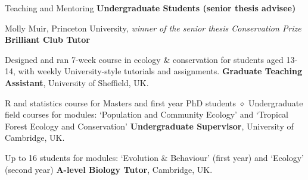 \begin{rubric}{Teaching and Mentoring}
\entry*[2019 -- 2020] \textbf{Undergraduate Students (senior thesis advisee)}
\par Molly Muir, Princeton University, \emph{winner of the senior thesis Conservation Prize}
\entry*[2017 -- 2018] \textbf{Brilliant Club Tutor}
\par Designed and ran 7-week course in ecology \& conservation for students aged 13-14, with weekly University-style tutorials and assignments.
\entry*[2014 -- 2018] \textbf{Graduate Teaching Assistant}, University of Sheffield, UK.
\par R and statistics course for Masters and first year PhD students $\diamond$ Undergraduate field courses for modules: `Population and Community Ecology' and `Tropical Forest Ecology and Conservation'
%
\entry*[2013 -- 2014] \textbf{Undergraduate Supervisor}, University of Cambridge, UK.
\par Up to 16 students for modules: `Evolution \& Behaviour' (first year) and  `Ecology' (second year)
\entry*[2013 -- 2014] \textbf{A-level Biology Tutor}, Cambridge, UK.

\end{rubric}